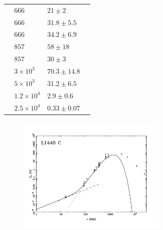 \documentclass[9pt]{extarticle}   	%
\begin{document}
\begin{table}
\begin{center}
\begin{tabular}{llll}
 & $666$ & $21\pm2$ & \citet{1998ApJ...509..733B}\\
 & $666$ & $31.8\pm5.5$ & \citet{2000ApJS..131..249S}\\
 & $666$ & $34.2\pm6.9$ & \citet{2000ApJ...530..851C}\\
 & $857$ & $58\pm18$ & \citet{2000ApJ...530..851C}\\
 & $857$ & $30\pm3$ & \citet{1998ApJ...509..733B}\\
 & $3\times10^{3}$ & $70.3\pm14.8$ & \citet{1998ApJ...509..733B}\\
 & $5\times10^{3}$ & $31.2\pm6.5$ & \citet{1998ApJ...509..733B}\\
 & $1.2\times10^{4}$ & $2.9\pm0.6$ & \citet{1998ApJ...509..733B}\\
 & $2.5\times10^{4}$ & $0.33\pm0.07$ & \citet{1998ApJ...509..733B}\\
\end{tabular}
\end{center}
\label{default}
\end{table}%

\begin{figure}[htbp]
\begin{center}
\includegraphics[width=0.65\textwidth]{plots/L1448C.pdf}
\label{default}
\end{center}
\end{figure}

\clearpage
\end{document}
